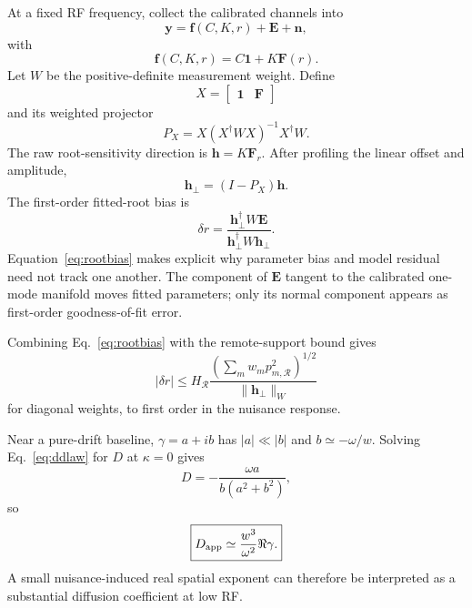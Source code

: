 \documentclass[aps,pra,twocolumn,superscriptaddress,nofootinbib]{revtex4-2}
\newcommand{\Rregion}{\mathcal{R}}
\begin{document}
At a fixed RF frequency, collect the calibrated channels into
\begin{equation}
\bm y=\bm f(C,K,r)+\bm E+\bm n,
\end{equation}
with
\begin{equation}
\bm f(C,K,r)=C\bm 1+K\bm F(r).
\end{equation}
Let $W$ be the positive-definite measurement weight. Define
\begin{equation}
X=\begin{bmatrix}\bm 1 & \bm F\end{bmatrix}
\end{equation}
and its weighted projector
\begin{equation}
P_X=X(X^\dagger W X)^{-1}X^\dagger W.
\end{equation}
The raw root-sensitivity direction is $\bm h=K\bm F_r$. After profiling the linear offset and amplitude,
\begin{equation}
\bm h_\perp=(I-P_X)\bm h.
\end{equation}
The first-order fitted-root bias is
\begin{equation}
\boxed{
\delta r=
\frac{\bm h_\perp^\dagger W\bm E}
{\bm h_\perp^\dagger W\bm h_\perp}.
}
\label{eq:rootbias}
\end{equation}
Equation~\eqref{eq:rootbias} makes explicit why parameter bias and model residual need not track one another. The component of $\bm E$ tangent to the calibrated one-mode manifold moves fitted parameters; only its normal component appears as first-order goodness-of-fit error.

Combining Eq.~\eqref{eq:rootbias} with the remote-support bound gives
\begin{equation}
\boxed{
|\delta r|
\le H_{\Rregion}
\frac{\left(\sum_m w_m p_{m,\Rregion}^2\right)^{1/2}}
{\|\bm h_\perp\|_W}
}
\label{eq:rootbound}
\end{equation}
for diagonal weights, to first order in the nuisance response.

Near a pure-drift baseline, $\gamma=a+ib$ has $|a|\ll|b|$ and $b\simeq-\omega/w$. Solving Eq.~\eqref{eq:ddlaw} for $D$ at $\kappa=0$ gives
\begin{equation}
D=-\frac{\omega a}{b(a^2+b^2)},
\end{equation}
so
\begin{equation}
\boxed{
D_{\rm app}\simeq\frac{w^3}{\omega^2}\Re\gamma.
}
\label{eq:driftsusceptibility}
\end{equation}
A small nuisance-induced real spatial exponent can therefore be interpreted as a substantial diffusion coefficient at low RF.
\end{document}
